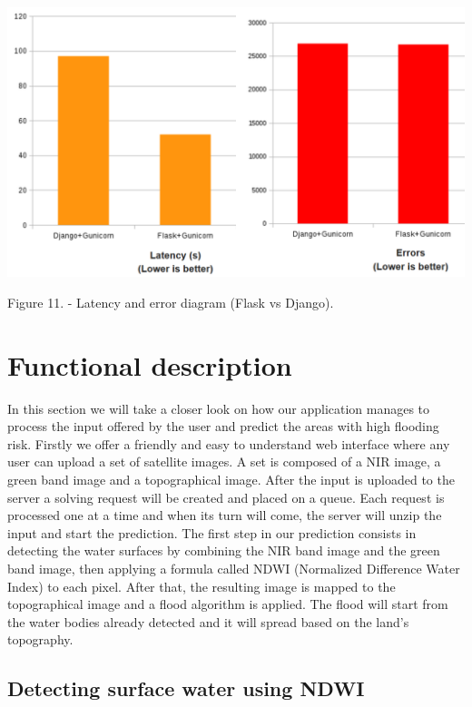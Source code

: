 \documentclass[12pt, a4paper]{report}
\begin{document}
\medskip
\includegraphics[scale=0.6, center]{django-flask-latency.png}
\begin{center}
Figure 11. \cite{Flask2} - Latency and error diagram (Flask vs Django).
\end{center}




\section{Functional description}

\quad
In this section we will take a closer look on how our application manages to process the input offered by the user and predict the areas with high flooding risk. Firstly we offer a friendly and easy to understand web interface where any user can upload a set of satellite images. A set is composed of a NIR image, a green band image and a topographical image.
 After the input is uploaded to the server a solving request will be created and placed on a queue. Each request is processed one at a time and when its turn will come, the server will unzip the input and start the prediction. The first step in our prediction consists in detecting the water surfaces by combining the NIR band image and the green band image, then applying a formula called NDWI (Normalized Difference Water Index) to each pixel. After that, the resulting image is mapped to the topographical image and a flood algorithm is applied. The flood will start from the water bodies already detected and it will spread based on the land's topography.

\newpage
\subsection{Detecting surface water using NDWI}
\quad 
\end{document}
